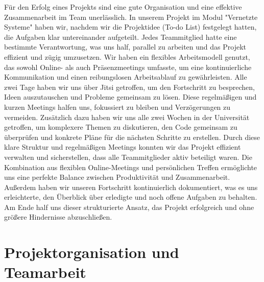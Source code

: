 Für den Erfolg eines Projekts sind eine gute Organisation und eine effektive Zusammenarbeit im Team unerlässlich. In unserem Projekt im Modul "Vernetzte Systeme" haben wir, nachdem wir die Projektidee (To-do List) festgelegt hatten, die Aufgaben klar untereinander aufgeteilt. Jedes Teammitglied hatte eine bestimmte Verantwortung, was uns half, parallel zu arbeiten und das Projekt effizient und zügig umzusetzen. Wir haben ein flexibles Arbeitsmodell genutzt, das sowohl Online- als auch Präsenzmeetings umfasste, um eine kontinuierliche Kommunikation und einen reibungslosen Arbeitsablauf zu gewährleisten. Alle zwei Tage haben wir uns über Jitsi getroffen, um den Fortschritt zu besprechen, Ideen auszutauschen und Probleme gemeinsam zu lösen. Diese regelmäßigen und kurzen Meetings halfen uns, fokussiert zu bleiben und Verzögerungen zu vermeiden. Zusätzlich dazu haben wir uns alle zwei Wochen in der Universität getroffen, um komplexere Themen zu diskutieren, den Code gemeinsam zu überprüfen und konkrete Pläne für die nächsten Schritte zu erstellen. Durch diese klare Struktur und regelmäßigen Meetings konnten wir das Projekt effizient verwalten und sicherstellen, dass alle Teammitglieder aktiv beteiligt waren. Die Kombination aus flexiblen Online-Meetings und persönlichen Treffen ermöglichte uns eine perfekte Balance zwischen Produktivität und Zusammenarbeit. Außerdem haben wir unseren Fortschritt kontinuierlich dokumentiert, was es uns erleichterte, den Überblick über erledigte und noch offene Aufgaben zu behalten. Am Ende half uns dieser strukturierte Ansatz, das Projekt erfolgreich und ohne größere Hindernisse abzuschließen. 

\section{Projektorganisation und Teamarbeit}\label {einleitung}
